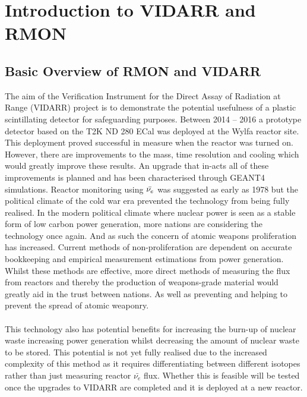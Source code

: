 
\ifpdf
    \graphicspath{{Chapter1/Figs/Raster/}{Chapter1/Figs/PDF/}{Chapter1/Figs/}}
\else
    \graphicspath{{Chapter1/Figs/Vector/}{Chapter1/Figs/}}
\fi

\chapter{Introduction to VIDARR and RMON} \label{Chap:theAimOfVidarr} %

\section{Basic Overview of RMON and VIDARR}
The aim of the Verification Instrument for the Direct Assay of Radiation at Range (VIDARR) project is to demonstrate the potential usefulness of a plastic scintillating detector for safeguarding purposes. Between 2014 -- 2016 a prototype detector based on the T2K ND 280 ECal \cite{Allan_2013} was deployed at the Wylfa reactor site. This deployment proved successful in measure when the reactor was turned on. However, there are improvements to the mass, time resolution and cooling which would greatly improve these results. An upgrade that in-acts all of these improvements is planned and has been characterised through GEANT4 \cite{Agostinelli:2002hh} simulations. Reactor monitoring using $\Bar{\nu_e}$ was suggested as early as 1978 \cite{Borovoi_1978} but the political climate of the cold war era prevented the technology from being fully realised. In the modern political climate where nuclear power is seen as a stable form of low carbon power generation, more nations are considering the technology once again. And as such the concern of atomic weapons proliferation has increased. Current methods of non-proliferation are dependent on accurate bookkeeping and empirical measurement estimations from power generation. Whilst these methods are effective, more direct methods of measuring the flux from reactors and thereby the production of weapons-grade material would greatly aid in the trust between nations. As well as preventing and helping to prevent the spread of atomic weaponry. 
\\\\This technology also has potential benefits for increasing the burn-up of nuclear waste increasing power generation whilst decreasing the amount of nuclear waste to be stored. This potential is not yet fully realised due to the increased complexity of this method as it requires differentiating between different isotopes rather than just measuring reactor $\bar{\nu_e}$ flux. Whether this is feasible will be tested once the upgrades to VIDARR are completed and it is deployed at a new reactor.  


